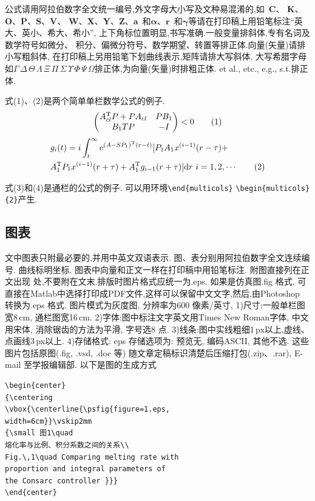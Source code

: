 \documentclass{Style/aas}
\begin{document}
\begin{multicols}{2}
公式请用阿拉伯数字全文统一编号,外文字母大小写及文种易混淆的,如~{\bf C}、
{\bf K}、{\bf O}、{\bf P}、{\bf S}、{\bf V}、{\bf
W}、{\bf X}、{\bf Y}、{\bf Z}、${\pmb a}$~和${\pmb\alpha}$、${\pmb
r}$~和${\pmb\gamma}$等请在打印稿上用铅笔标注``英大、英小、希大、希小'',
上下角标位置明显,书写准确.一般变量排斜体,专有名词及数学符号如微分、
积分、偏微分符号、数学期望、转置等排正体.向量(矢量)请排小写粗斜体,
在打印稿上另用铅笔下划曲线表示,矩阵请排大写斜体.
大写希腊字母如$\Gamma\,\Delta\,\Theta\,\Lambda\,\Xi\,\Pi\,\Sigma\,
\Upsilon\,\Phi\,\Psi\,\Omega$排正体,为向量(矢量)时排粗正体. et al.,
etc., e.g., s.t.排正体.

式(1)、(2)是两个简单单栏数学公式的例子.
\begin{equation}
\begin{pmatrix}
A_{cl}^{\rm T}P+PA_{cl}&PB_1\\
B_1TP&-I
\end{pmatrix}
<0 \tag{1}
\end{equation}
\allowdisplaybreaks
\begin{align}
&{\sl g}_i(t)=i\int_t^\infty {\rm e}^{(A-SP_1)^{\rm T}(r-t)}[P_1A_1
x^{(i-1)}(r-\tau)+
\nonumber\\
&A_1^{\rm T}P_1 x^{(i-1)}(r+\tau)+A_1^ {\rm T}{\sl
g}_{i-1}(r+\tau)]{\rm d}r\ i=1,2,\cdots \tag{2}
\end{align}


式(3)和(4)是通栏的公式的例子.
可以用环境\verb|\end{multicols}| \verb|\begin{multicols}{2}|产生.

\subsection{图表}



文中图表只附最必要的,并用中英文双语表示.
图、表分别用阿拉伯数字全文连续编号. 曲线标明坐标.
图表中向量和正文一样在打印稿中用铅笔标注. 附图直接列在正文出现
处,不要附在文末.排版时图片格式应统一为.eps. 如果是仿真图.fig 格式,
可直接在Matlab中选择打印成PDF文件,这样可以保留中文文字,然后,由Photoshop 转换为.eps 格式.
图片模式为灰度图, 分辨率为600 像素/英寸, 1)尺寸:一般单栏图宽8\,cm, 通栏图宽16\,cm. 2)字体:图中标注文字英文用Times New Roman字体,
中文用宋体, 消除锯齿的方法为平滑, 字号选8 点. 3)线条:图中实线粗细1\,px以上,虚线、点画线3\,px以上.
4)存储格式: eps 存储选项为: 预览无, 编码ASCII, 其他不选.
这些图片包括原图(.fig, .vsd, .doc 等) 随文章定稿标识清楚后压缩打包(.zip、.rar), E-mail 至学报编辑部. 以下是图的生成方式
\begin{verbatim}
\begin{center}
{\centering
\vbox{\centerline{\psfig{figure=1.eps,
width=6cm}}\vskip2mm
{\small 图1\quad
熔化率与比例、积分系数之间的关系\\
Fig.\,1\quad Comparing melting rate with
proportion and integral parameters of
the Consarc controller }}}
\end{center}
\end{verbatim}








\end{multicols}
\end{document}
